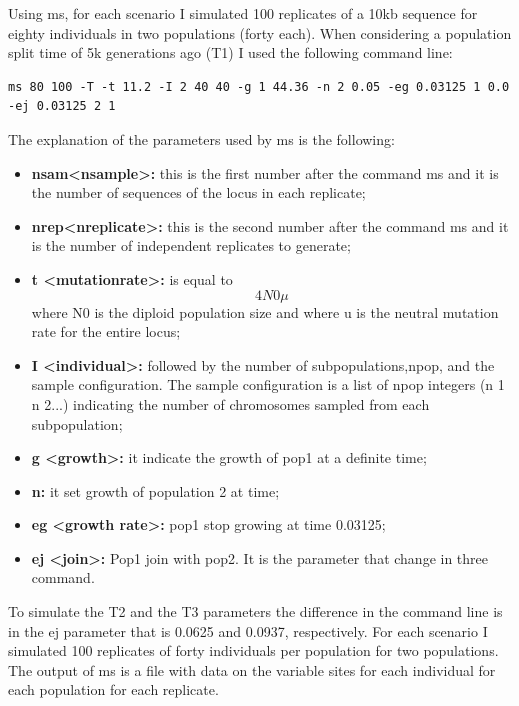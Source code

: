 Using ms, for each scenario I simulated 100 replicates of a 10kb sequence for eighty individuals in two populations (forty each). When considering a population split time of 5k generations ago (T1) I used the following command line: 
\begin{verbatim}
ms 80 100 -T -t 11.2 -I 2 40 40 -g 1 44.36 -n 2 0.05 -eg 0.03125 1 0.0 -ej 0.03125 2 1   
\end{verbatim}

The explanation of the parameters used by ms is the following:

\begin{itemize}
\item\textbf{nsam<nsample>:} this is the first number after the command ms and it is the number of sequences of the locus in each replicate; 

\item\textbf{nrep<nreplicate>:} this is the second number after the command ms and it is the number of independent replicates to generate;

\item\textbf{t <mutationrate>:}
is equal to $$4N0\mu$$ where N0 is the diploid population size and where u is the neutral mutation rate for the entire locus;

\item\textbf{I <individual>:}
followed by the number of subpopulations,npop, and the sample configuration. The sample configuration is a list of npop integers (n 1 n 2...) indicating the number of chromosomes sampled from each subpopulation;

\item\textbf{g <growth>:}
 it indicate the growth of pop1 at a definite time;

\item\textbf{n:}
it set growth of population 2 at time; 

\item\textbf{eg <growth rate>:}
pop1 stop growing at time 0.03125;

\item\textbf{ej <join>:}
Pop1 join with pop2. It is the parameter that change in three command. 
\end{itemize}

To simulate the T2 and the T3 parameters the difference in the command line is in the ej parameter that is 0.0625 and 0.0937, respectively. For each scenario I simulated 100 replicates of forty individuals per population for two populations. The output of ms is a file with data on the variable sites for each individual for each population for each replicate. 

